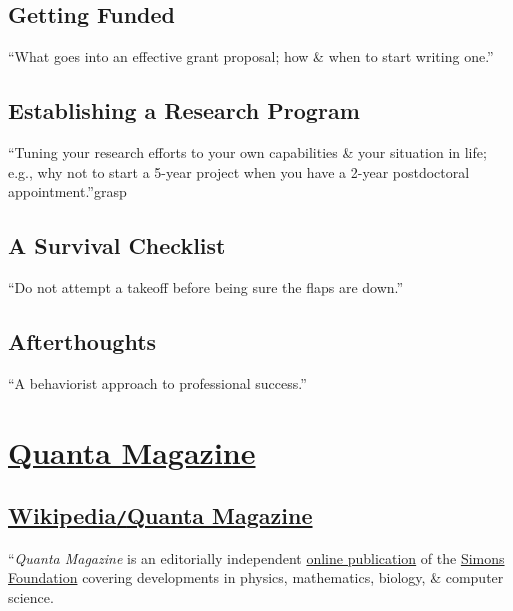 \documentclass[oneside]{book}
\numberwithin{equation}{section}
\begin{document}
\section{Getting Funded}

\begin{flushright}
	``What goes into an effective grant proposal; how \& when to start writing one.''
\end{flushright}

\section{Establishing a Research Program}

\begin{flushright}
	``Tuning your research efforts to your own capabilities \& your situation in life; e.g., why not to start a 5-year project when you have a 2-year postdoctoral appointment.''grasp
\end{flushright}

\section{A Survival Checklist}

\begin{flushright}
	``Do not attempt a takeoff before being sure the flaps are down.''
\end{flushright}

\section{Afterthoughts}

\begin{flushright}
	``A behaviorist approach to professional success.''
\end{flushright}


\chapter{\href{https://www.quantamagazine.org/V}{Quanta Magazine}}

\section{\href{https://en.wikipedia.org/wiki/Quanta_Magazine}{Wikipedia\texttt{/}Quanta Magazine}}
``\textit{Quanta Magazine} is an editorially independent \href{https://en.wikipedia.org/wiki/Online_publication}{online publication} of the \href{https://en.wikipedia.org/wiki/Simons_Foundation}{Simons Foundation} covering developments in physics, mathematics, biology, \& computer science.
\end{document}
